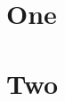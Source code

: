 \documentclass{article}
\begin{document}
\section{One}
 \lipsum[1-3]

 \section{Two}
\lipsum[4-6]

 
\end{document}
